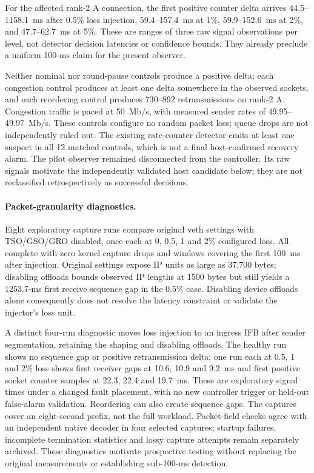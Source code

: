 \documentclass[sigconf]{acmart}
\begin{document}
For the affected rank-2 A connection, the first positive counter delta
arrives 44.5--1158.1~ms after 0.5\% loss injection, 59.4--157.4~ms at
1\%, 59.9--152.6~ms at 2\%, and 47.7--62.7~ms at 5\%. These are ranges
of three raw signal observations per level, not detector decision
latencies or confidence bounds. They already preclude a uniform
100-ms claim for the present observer.

Neither nominal nor round-pause controls produce a positive delta;
each congestion control produces at least one delta somewhere in the
observed sockets, and each reordering control produces 730--892
retransmissions on rank-2 A. Congestion traffic is paced at 50~Mb/s,
with measured sender rates of 49.95--49.97~Mb/s. These controls configure
no random packet loss; queue drops are not independently ruled out.
The existing rate-counter detector emits at least one suspect in all
12 matched controls, which is not a final host-confirmed recovery alarm.
The pilot observer remained disconnected from the controller. Its raw
signals motivate the independently validated host candidate below; they
are not reclassified retrospectively as successful decisions.

\paragraph{Packet-granularity diagnostics.}
Eight exploratory capture runs compare original veth settings with
TSO/GSO/GRO disabled, once each at 0, 0.5, 1 and 2\% configured loss.
All complete with zero kernel capture drops and windows covering the
first 100~ms after injection. Original settings expose IP units as large
as 37,700 bytes; disabling offloads bounds observed IP lengths at
1500 bytes but still yields a 1253.7-ms first receive sequence gap in
the 0.5\% case. Disabling device offloads alone consequently does not
resolve the latency constraint or validate the injector's loss unit.

A distinct four-run diagnostic moves loss injection to an ingress IFB
after sender segmentation, retaining the shaping and disabling offloads.
The healthy run shows no sequence gap or positive retransmission delta;
one run each at 0.5, 1 and 2\% loss shows first receiver gaps at
10.6, 10.9 and 9.2~ms and first positive socket counter samples at
22.3, 22.4 and 19.7~ms. These are exploratory signal times under a
changed fault placement, with no new controller trigger or held-out
false-alarm validation. Reordering can also create sequence gaps.
The captures cover an eight-second prefix, not the full workload.
Packet-field checks agree with an independent native decoder in four
selected captures; startup failures, incomplete termination statistics
and lossy capture attempts remain separately archived. These diagnostics
motivate prospective testing without replacing the original measurements
or establishing sub-100-ms detection.
\end{document}
